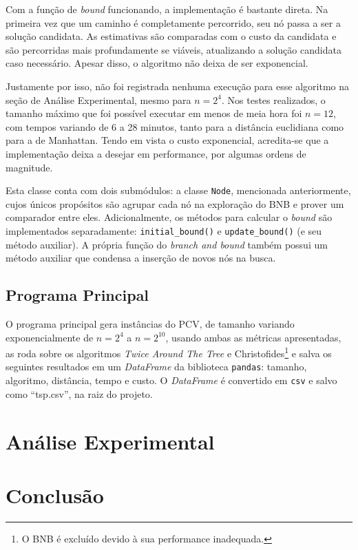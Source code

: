 \documentclass{article}
\begin{document}
\begin{itemize}
	      Com a função de \textit{bound} funcionando, a implementação é bastante direta. Na primeira vez que um caminho é completamente percorrido, seu nó passa a ser a solução candidata. As estimativas são comparadas com o custo da candidata e são percorridas mais profundamente se viáveis, atualizando a solução candidata caso necessário. Apesar disso, o algoritmo não deixa de ser exponencial.

	      Justamente por isso, não foi registrada nenhuma execução para esse algoritmo na seção de Análise Experimental, mesmo para \( n = 2^4 \). Nos testes realizados, o tamanho máximo que foi possível executar em menos de meia hora foi \( n = 12 \), com tempos variando de 6 a 28 minutos, tanto para a distância euclidiana como para a de Manhattan. Tendo em vista o custo exponencial, acredita-se que a implementação deixa a desejar em performance, por algumas ordens de magnitude.

	      Esta classe conta com dois submódulos: a classe \texttt{Node}, mencionada anteriormente, cujos únicos propósitos são agrupar cada nó na exploração do BNB e prover um comparador entre eles. Adicionalmente, os métodos para calcular o \textit{bound} são implementados separadamente: \texttt{initial\_bound()} e \texttt{update\_bound()} (e seu método auxiliar). A própria função do \textit{branch and bound} também possui um método auxiliar que condensa a inserção de novos nós na busca.

\end{itemize}

\subsection{Programa Principal}

O programa principal gera instâncias do PCV, de tamanho variando exponencialmente de \( n=2^{4} \) a \( n=2^{10} \), usando ambas as métricas apresentadas, as roda sobre os algoritmos \textit{Twice Around The Tree} e Christofides\footnote{O BNB é excluído devido à sua performance inadequada.} e salva os seguintes resultados em um \textit{DataFrame} da biblioteca \texttt{pandas}: tamanho, algoritmo, distância, tempo e custo. O \textit{DataFrame} é convertido em \texttt{csv} e salvo como ``tsp.csv'', na raiz do projeto.

\section{Análise Experimental}

\section{Conclusão}

\end{document}
